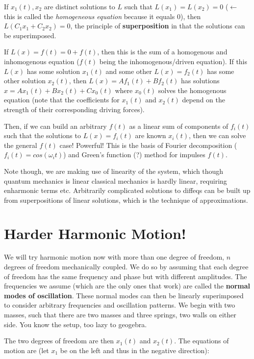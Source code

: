 \documentclass{report}
\begin{document}
If $x_1(t), x_2$ are distinct solutions to $L$ such that $L(x_1) = L(x_2) = 0$ ($\leftarrow$ this is called the \emph{homogeneous equation} because it equals $0$), then $L(C_1 x_1 + C_2 x_2) = 0$, the principle of \textbf{superposition} in that the solutions can be superimposed.

If $L(x) = f(t) = 0 + f(t)$, then this is the sum of a homogenous and inhomogenous equation ($f(t)$ being the inhomogenous/driven equation). If this $L(x)$ has some solution $x_1(t)$ and some other $L(x) = f_2(t)$ has some other solution $x_2(t)$, then $L(x) = Af_1(t) + Bf_2(t)$ has solutions $x = Ax_1(t) + Bx_2(t) + Cx_0(t)$ where $x_0(t)$ solves the homogenous equation (note that the coefficients for $x_1(t)$ and $x_2(t)$ depend on the strength of their corresponding driving forces).

Then, if we can build an arbitrary $f(t)$ as a linear sum of components of $f_i(t)$ such that the solutions to $L(x) = f_i(t)$ are known $x_i(t)$, then we can solve the general $f(t)$ case! Powerful! This is the basis of Fourier decomposition ($f_i(t) = cos(\omega_i t)$) and Green's function (?) method for impulses $f(t)$. 

Note though, we are making use of linearity of the system, which though quantum mechanics is linear classical mechanics is hardly linear, requiring enharmonic terms etc. Arbitrarily complicated solutions to diffeqs can be built up from superpositions of linear solutions, which is the technique of approximations. 

\section{Harder Harmonic Motion!}

We will try harmonic motion now with more than one degree of freedom, $n$ degrees of freedom mechanically coupled. We do so by assuming that each degree of freedom has the same frequency and phase but with different amplitudes. The frequencies we assume (which are the only ones that work) are called the \textbf{normal modes of oscillation}. These normal modes can then be linearly superimposed to consider arbitrary frequencies and oscillation patterns. We begin with two masses, such that there are two masses and three springs, two walls on either side. You know the setup, too lazy to geogebra.

The two degrees of freedom are then $x_1(t)$ and $x_2(t)$. The equations of motion are (let $x_1$ be on the left and thus in the negative direction):
\end{document}
